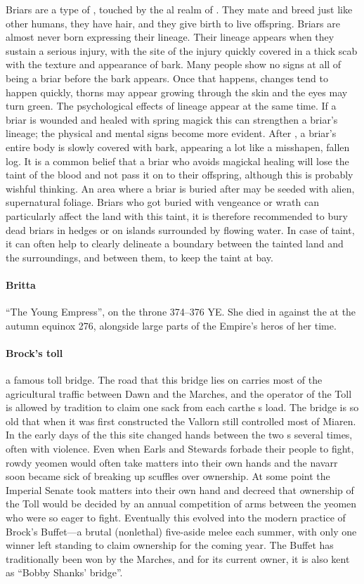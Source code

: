  Briars are a type of , touched by the al realm of . \localpar They mate and breed just like other humans, they have hair, and they give birth to live offspring. Briars are almost never born expressing their lineage. Their lineage appears when they sustain a serious injury, with the site of the injury quickly covered in a thick scab with the texture and appearance of bark. \localpar Many people show no signs at all of being a briar before the bark appears. Once that happens, changes tend to happen quickly, thorns may appear growing through the skin and the eyes may turn green. The psychological effects of lineage appear at the same time. If a briar is wounded and healed with spring magick this can strengthen a briar's lineage; the physical and mental signs become more evident. \localpar After , a briar’s entire body is slowly covered with bark, appearing a lot like a misshapen, fallen log. It is a common belief that a briar who avoids magickal healing will lose the taint of the blood and not pass it on to their offspring, although this is probably wishful thinking. An area where a briar is buried after  may be seeded with alien, supernatural foliage. \localpar Briars who got buried with vengeance or wrath can particularly affect the land with this taint, it is therefore recommended to bury dead briars in hedges or on islands surrounded by flowing water. In case of taint, it can often help to clearly delineate a boundary between the tainted land and the surroundings, and  between them, to keep the taint at bay.
\paragraph{Britta} “The Young Empress”, on the throne 374–376 YE. She died in  against the  at the autumn equinox 276, alongside large parts of the Empire's heros of her time.
\paragraph{Brock's toll} a famous toll bridge. The road that this bridge lies on carries most of the agricultural traffic between Dawn and the Marches, and the operator of the Toll is allowed by tradition to claim one sack from each carthe s load. The bridge is so old that when it was first constructed the Vallorn still controlled most of Miaren. \localpar In the early days of the  this site changed hands between the two s several times, often with violence. Even when Earls and Stewards forbade their people to fight, rowdy yeomen would often take matters into their own hands and the navarr soon became sick of breaking up scuffles over ownership. At some point the Imperial Senate took matters into their own hand and decreed that ownership of the Toll would be decided by an annual competition of arms between the yeomen who were so eager to fight. Eventually this evolved into the modern practice of Brock's Buffet—a brutal (nonlethal) five-aside melee each summer, with only one winner left standing to claim ownership for the coming year. The Buffet has traditionally been won by the Marches, and for its current owner, it is also kent as “Bobby Shanks' bridge”.
